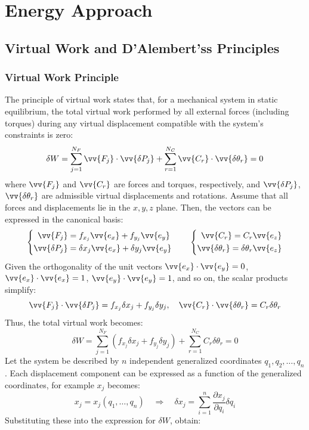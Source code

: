 
\chapter{Energy Approach}

\section{Virtual Work and D'Alembert'ss Principles}

\subsection{Virtual Work Principle} 

The principle of virtual work states that, for a mechanical system in static equilibrium, the total virtual work performed by all external forces (including torques) during any virtual displacement compatible with the system’s constraints is zero:
\[
\delta W = \sum_{j=1}^{N_F} \vv{F_j} \cdot \vv{\delta P_j} + \sum_{r=1}^{N_C} \vv{C_r} \cdot \vv{\delta \theta_r} = 0
\]
where \( \vv{F_j} \) and \( \vv{C_r} \) are forces and torques, respectively, and \( \vv{\delta P_j} \), \( \vv{\delta \theta_r} \) are admissible virtual displacements and rotations. Assume that all forces and displacements lie in the \( x, y, z \) plane. Then, the vectors can be expressed in the canonical basis:
\[
\left\{
\begin{aligned}
\vv{F_j} &= f_{x_j} \vv{e_x} + f_{y_j} \vv{e_y} \\
\vv{\delta P_j} &= \delta x_j \vv{e_x} + \delta y_j \vv{e_y}
\end{aligned}
\right.
\quad \quad
\left\{
\begin{aligned}
\vv{C_r} = C_r \vv{e_z} \\
\vv{\delta \theta_r} = \delta \theta_r \vv{e_z}
\end{aligned}
\right.
\]
Given the orthogonality of the unit vectors \( \vv{e_x} \cdot \vv{e_y} = 0 \), \( \vv{e_x} \cdot \vv{e_x} = 1 \), \( \vv{e_y} \cdot \vv{e_y} = 1 \), and so on, the scalar products simplify:
\[
\vv{F_j} \cdot \vv{\delta P_j} = f_{x_j} \delta x_j + f_{y_j} \delta y_j, \quad \vv{C_r} \cdot \vv{\delta \theta_r} = C_r \delta \theta_r
\]
Thus, the total virtual work becomes:
\[
\delta W = \sum_{j=1}^{N_F} \left( f_{x_j} \delta x_j + f_{y_j} \delta y_j \right) + \sum_{r=1}^{N_C} C_r \delta \theta_r = 0
\]
Let the system be described by \( n \) independent generalized coordinates \( q_1, q_2, \ldots, q_n \). Each displacement component can be expressed as a function of the generalized coordinates, for example \( x_j \) becomes:
\[
x_j = x_j(q_1, \ldots, q_n) \quad \Rightarrow \quad \delta x_j = \sum_{i=1}^n \frac{\partial x_j}{\partial q_i} \delta q_i
\]
Substituting these into the expression for \( \delta W \), obtain:

